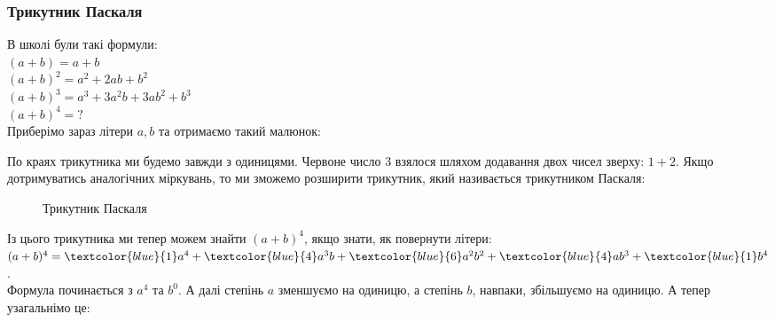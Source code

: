\documentclass[a4paper, 14pt]{article}
\theoremstyle{theoremdd}
\theoremstyle{theoremdd}
\theoremstyle{theoremdd}
\theoremstyle{theoremdd}
\theoremstyle{theoremdd}
\theoremstyle{theoremdd}
\theoremstyle{theoremdd}
\theoremstyle{theoremdd}
\begin{document}
	\subsubsection*{Трикутник Паскаля}
	В школі були такі формули:\\
	$(a+b) = a + b$\\
	$(a+b)^2 = a^2+2ab + b^2$\\
	$(a+b)^3 = a^3 + 3a^2b + 3ab^2 + b^3$\\
	$(a+b)^4 = ?$\\
	Приберімо зараз літери $a,b$ та отримаємо такий малюнок:
\begin{figure}[H]
\centering
\end{figure}
	По краях трикутника ми будемо завжди з одиницями. Червоне число $3$ взялося шляхом додавання двох чисел зверху: $1 + 2$. Якщо дотримуватись аналогічних міркувань, то ми зможемо розширити трикутник, який називається трикутником Паскаля:
\begin{figure}[H]
\centering
	\caption*{Трикутник Паскаля}
\end{figure}
	Із цього трикутника ми тепер можем знайти $(a+b)^4$, якщо знати, як повернути літери:\\
	$(a+b)^4 = \textcolor{blue}{1} a^4 + \textcolor{blue}{4}a^3 b + \textcolor{blue}{6} a^2  b^2 + \textcolor{blue}{4}a b^3 + \textcolor{blue}{1} b^4$.\\
	Формула починається з $a^4$ та $b^0$. А далі степінь $a$ зменшуємо на одиницю, а степінь $b$, навпаки, збільшуємо на одиницю. А тепер узагальнімо це:
	
\end{document}
